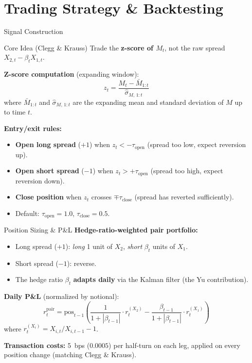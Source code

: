 \documentclass[10pt, aspectratio=169]{beamer}
\begin{document}
\section{Trading Strategy \& Backtesting}

\begin{frame}{Signal Construction}
  \begin{block}{Core Idea (Clegg \& Krauss)}
    Trade the \textbf{z-score of $M_t$}, not the raw spread
    $X_{2,t} - \beta_t X_{1,t}$.
  \end{block}
  \vspace{4pt}

  \textbf{Z-score computation} (expanding window):
  \[
    z_t = \frac{M_t - \bar{M}_{1:t}}{\hat{\sigma}_{M,\,1:t}}
  \]
  where $\bar{M}_{1:t}$ and $\hat{\sigma}_{M,\,1:t}$ are the expanding
  mean and standard deviation of $M$ up to time $t$.

  \vspace{6pt}
  \textbf{Entry/exit rules:}
  \begin{itemize}
    \item \textbf{Open long spread} ($+1$) when $z_t < -\tau_{\text{open}}$
          (spread too low, expect reversion up).
    \item \textbf{Open short spread} ($-1$) when $z_t > +\tau_{\text{open}}$
          (spread too high, expect reversion down).
    \item \textbf{Close position} when $z_t$ crosses $\mp\tau_{\text{close}}$
          (spread has reverted sufficiently).
    \item Default: $\tau_{\text{open}} = 1.0$, $\tau_{\text{close}} = 0.5$.
  \end{itemize}
\end{frame}

\begin{frame}{Position Sizing \& P\&L}
  \textbf{Hedge-ratio-weighted pair portfolio:}
  \begin{itemize}
    \item Long spread ($+1$): \emph{long} 1 unit of $X_2$, \emph{short}
          $\beta_t$ units of $X_1$.
    \item Short spread ($-1$): reverse.
    \item The hedge ratio $\beta_t$ \textbf{adapts daily} via the Kalman filter
          (the Yu contribution).
  \end{itemize}

  \vspace{6pt}
  \textbf{Daily P\&L} (normalized by notional):
  \[
    r_t^{\text{pair}} = \text{pos}_{t-1}\left(
      \frac{1}{1+|\beta_{t-1}|}\cdot r_t^{(X_2)}
      - \frac{\beta_{t-1}}{1+|\beta_{t-1}|}\cdot r_t^{(X_1)}
    \right)
  \]
  where $r_t^{(X_i)} = X_{i,t}/X_{i,t-1} - 1$.

  \vspace{6pt}
  \textbf{Transaction costs:} 5~bps ($0.0005$) per half-turn on each leg,
  applied on every position change (matching Clegg \& Krauss).
\end{frame}
\end{document}
